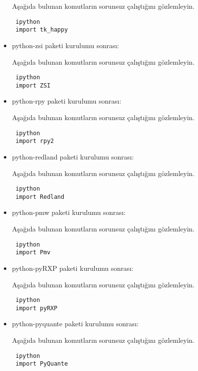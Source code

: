 \documentclass[a4paper,10pt]{article}
\begin{document}
\begin{itemize}
Aşağıda bulunan komutların sorunsuz çalıştığını gözlemleyin.

\begin{verbatim}
 ipython
 import tk_happy
\end{verbatim}

\item python-zsi paketi kurulumu sonrası:

Aşağıda bulunan komutların sorunsuz çalıştığını gözlemleyin.

\begin{verbatim}
 ipython
 import ZSI
\end{verbatim}


\item python-rpy paketi kurulumu sonrası:

Aşağıda bulunan komutların sorunsuz çalıştığını gözlemleyin.

\begin{verbatim}
 ipython
 import rpy2
\end{verbatim}

\item python-redland paketi kurulumu sonrası:

Aşağıda bulunan komutların sorunsuz çalıştığını gözlemleyin.

\begin{verbatim}
 ipython
 import Redland
\end{verbatim}

\item python-pmw paketi kurulumu sonrası:

Aşağıda bulunan komutların sorunsuz çalıştığını gözlemleyin.

\begin{verbatim}
 ipython
 import Pmv
\end{verbatim}

\item python-pyRXP paketi kurulumu sonrası:

Aşağıda bulunan komutların sorunsuz çalıştığını gözlemleyin.

\begin{verbatim}
 ipython
 import pyRXP
\end{verbatim}

\item python-pyquante paketi kurulumu sonrası:

Aşağıda bulunan komutların sorunsuz çalıştığını gözlemleyin.

\begin{verbatim}
 ipython
 import PyQuante
\end{verbatim}


\end{itemize}
\end{document}
